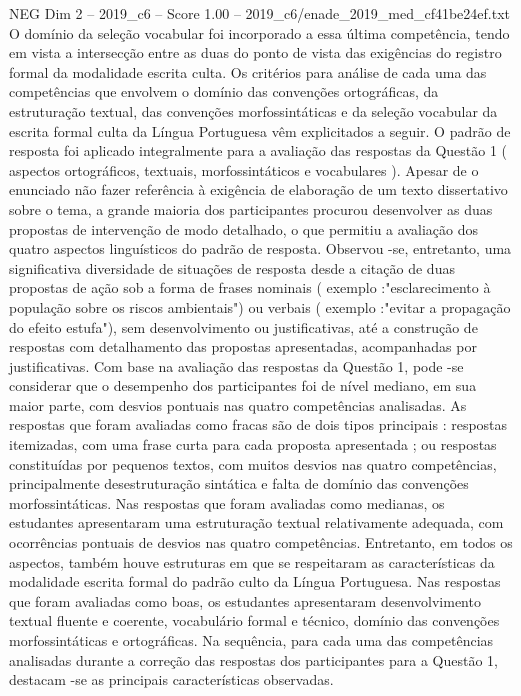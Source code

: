 \begin{textsample}{NEG Dim 2 – 2019\_c6 – Score 1.00 – 2019\_c6/enade\_2019\_med\_cf41be24ef.txt}
O domínio da seleção vocabular foi incorporado a essa última competência, tendo em vista a intersecção entre as duas do ponto de vista das exigências do registro formal da modalidade escrita culta.
Os critérios para análise de cada uma das competências que envolvem o domínio das convenções ortográficas, da estruturação textual, das convenções morfossintáticas e da seleção vocabular da escrita formal culta da Língua Portuguesa vêm explicitados a seguir.
O padrão de resposta foi aplicado integralmente para a avaliação das respostas da Questão 1 ( aspectos ortográficos, textuais, morfossintáticos e vocabulares ).
Apesar de o enunciado não fazer referência à exigência de elaboração de um texto dissertativo sobre o tema, a grande maioria dos participantes procurou desenvolver as duas propostas de intervenção de modo detalhado, o que permitiu a avaliação dos quatro aspectos linguísticos do padrão de resposta.
Observou -se, entretanto, uma significativa diversidade de situações de resposta desde a citação de duas propostas de ação sob a forma de frases nominais ( exemplo :"esclarecimento à população sobre os riscos ambientais") ou verbais ( exemplo :"evitar a propagação do efeito estufa"), sem desenvolvimento ou justificativas, até a construção de respostas com detalhamento das propostas apresentadas, acompanhadas por justificativas.
Com base na avaliação das respostas da Questão 1, pode -se considerar que o desempenho dos participantes foi de nível mediano, em sua maior parte, com desvios pontuais nas quatro competências analisadas.
As respostas que foram avaliadas como fracas são de dois tipos principais : respostas itemizadas, com uma frase curta para cada proposta apresentada ; ou respostas constituídas por pequenos textos, com muitos desvios nas quatro competências, principalmente desestruturação sintática e falta de domínio das convenções morfossintáticas.
Nas respostas que foram avaliadas como medianas, os estudantes apresentaram uma estruturação textual relativamente adequada, com ocorrências pontuais de desvios nas quatro competências.
Entretanto, em todos os aspectos, também houve estruturas em que se respeitaram as características da modalidade escrita formal do padrão culto da Língua Portuguesa.
Nas respostas que foram avaliadas como boas, os estudantes apresentaram desenvolvimento textual fluente e coerente, vocabulário formal e técnico, domínio das convenções morfossintáticas e ortográficas.
Na sequência, para cada uma das competências analisadas durante a correção das respostas dos participantes para a Questão 1, destacam -se as principais características observadas.

\end{textsample}

